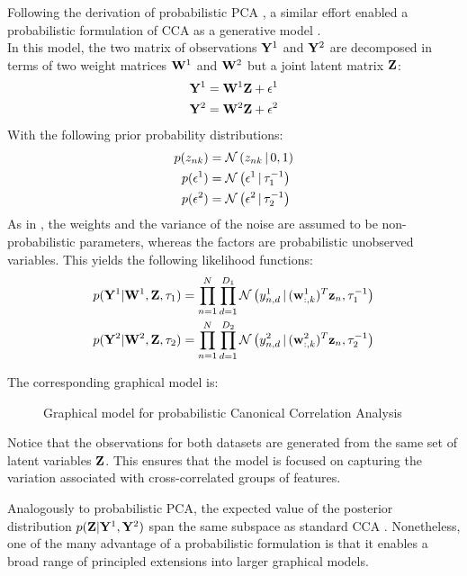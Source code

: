 Following the derivation of probabilistic PCA \cite{Tipping1999}, a similar effort enabled a probabilistic formulation of CCA as a generative model \cite{Bach2005}.\\
In this model, the two matrix of observations ${\bf Y}^{1}$ and ${\bf Y}^{2}$ are decomposed in terms of two weight matrices ${\bf W}^{1}$ and ${\bf W}^{2}$ but a joint latent matrix ${\bf Z}$:
\begin{align*}
	{\bf Y}^{1} &= {\bf W}^{1} {\bf Z} + \epsilon^{1} \\
	{\bf Y}^{2} &= {\bf W}^{2} {\bf Z} + \epsilon^{2}
\end{align*}
With the following prior probability distributions:
\begin{align*}
	p(z_{nk}) &= \mathcal{N}\left(z_{nk} \,|\, 0,1\right) \\
	p(\epsilon^{1}) &= \mathcal{N}\left(\epsilon^{1} \,|\, \tau_{1}^{-1}\right) \\
	p(\epsilon^{2}) &= \mathcal{N}\left(\epsilon^{2} \,|\, \tau_{2}^{-1}\right)
\end{align*}
As in \cite{Tipping1999}, the weights and the variance of the noise are assumed to be non-probabilistic parameters, whereas the factors are probabilistic unobserved variables. This yields the following likelihood functions:
\begin{align} \label{eq:probabilistic_cca_likelihood}
	p({\bf Y}^{1}|{\bf W}^{1},{\bf Z},\tau_{1}) &= \prod_{n=1}^{N} \prod_{d=1}^{D_1} \mathcal{N}\left(y^{1}_{n,d} \,|\, ({\bf w}_{:,k}^{1})^T {\bf z}_{n},\tau_{1}^{-1}\right) \\
	p({\bf Y}^{2}|{\bf W}^{2},{\bf Z},\tau_{2}) &= \prod_{n=1}^{N} \prod_{d=1}^{D_2} \mathcal{N}\left(y^{2}_{n,d} \,|\, ({\bf w}_{:,k}^{2})^T {\bf z}_{n},\tau_{2}^{-1}\right) \nonumber
\end{align}

The corresponding graphical model is:
\begin{figure}[H] \begin{center}
	
	\label{fig:graphical_CCA}
	\caption{Graphical model for probabilistic Canonical Correlation Analysis}
\end{center} \end{figure}

Notice that the observations for both datasets are generated from the same set of latent variables ${\bf Z}$. This ensures that the model is focused on capturing the variation associated with cross-correlated groups of features.

Analogously to probabilistic PCA, the expected value of the posterior distribution $p({\bf Z}|{\bf Y}^{1},{\bf Y}^{2})$ span the same subspace as standard CCA \cite{Bach2005}. Nonetheless, one of the many advantage of a probabilistic formulation is that it enables a broad range of principled extensions into larger graphical models.


